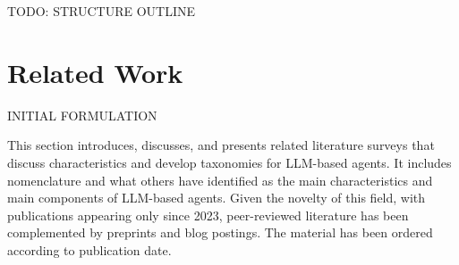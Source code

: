 \documentclass{article}
\begin{document}
TODO: STRUCTURE OUTLINE


\section{Related Work}
\label{sec:related}
INITIAL FORMULATION


This section introduces, discusses, and presents related literature surveys that discuss characteristics and develop taxonomies for LLM-based agents. It includes nomenclature and what others have identified as the main characteristics and main components of LLM-based agents. Given the novelty of this field, with publications appearing only since 2023, peer-reviewed literature has been complemented by preprints and blog postings. The material has been ordered according to publication date. 
\end{document}
